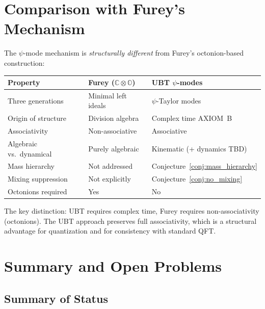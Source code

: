\documentclass[12pt,a4paper]{article}
\theoremstyle{remark}
\begin{document}
\section{Comparison with Furey's Mechanism}
\label{sec:furey_comparison}

The $\psi$-mode mechanism is \emph{structurally different} from Furey's
octonion-based construction:

\begin{center}
\begin{tabular}{lll}
  \hline
  Property & Furey ($\mathbb{C}\otimes\mathbb{O}$) & UBT $\psi$-modes \\
  \hline
  Three generations & Minimal left ideals & $\psi$-Taylor modes \\
  Origin of structure & Division algebra & Complex time AXIOM~B \\
  Associativity & Non-associative & Associative \\
  Algebraic vs.\ dynamical & Purely algebraic & Kinematic (+ dynamics TBD) \\
  Mass hierarchy & Not addressed & Conjecture~\ref{conj:mass_hierarchy} \\
  Mixing suppression & Not explicitly & Conjecture~\ref{conj:no_mixing} \\
  Octonions required & Yes & No \\
  \hline
\end{tabular}
\end{center}

The key distinction: UBT requires complex time, Furey requires non-associativity
(octonions).  The UBT approach preserves full associativity, which is a
structural advantage for quantization and for consistency with standard QFT.

\section{Summary and Open Problems}
\label{sec:summary}

\subsection{Summary of Status}
\end{document}
